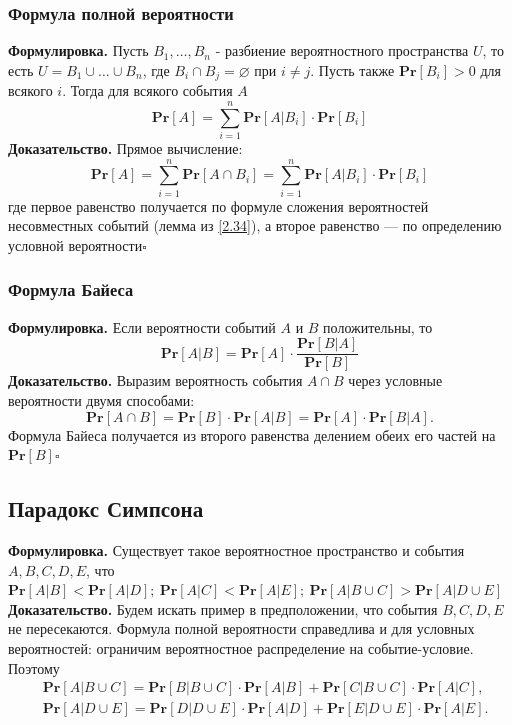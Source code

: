 \documentclass[a4paper]{article}
\newcommand{\qed}{\hfill$\square$}
\begin{document}
\subsubsection*{Формула полной вероятности}
\textbf{Формулировка.} Пусть $B_1, \ldots, B_n$ - разбиение вероятностного пространства $U$, то есть $U=B_1 \cup \ldots \cup B_n$, где $B_i \cap B_j=\varnothing$ при $i \neq j$. Пусть также $\textbf{Pr}\left[B_i\right]>0$ для всякого $i$. Тогда для всякого события $A$
$$\boxed{
\textbf{Pr}[A]=\sum_{i=1}^n \textbf{Pr}\left[A | B_i\right] \cdot \textbf{Pr}\left[B_i\right]}
$$
\indent\textbf{Доказательство.} Прямое вычисление:
$$
\textbf{Pr}[A]=\sum_{i=1}^n \textbf{Pr}\left[A \cap B_i\right]=\sum_{i=1}^n \textbf{Pr}\left[A | B_i\right] \cdot \textbf{Pr}\left[B_i\right]
$$
где первое равенство получается по формуле сложения вероятностей несовместных событий (лемма из \ref{2.34}), а второе равенство — по определению условной вероятности\qed

\subsubsection*{Формула Байеса}
\textbf{Формулировка.} Если вероятности событий $A$ и $B$ положительны, то $$\boxed{\textbf{Pr}[A|B]=\textbf{Pr}[A]\cdot\displaystyle\frac{\textbf{Pr}[B|A]}{\textbf{Pr}[B]}}$$
\indent\textbf{Доказательство.} Выразим вероятность события $A \cap B$ через условные вероятности двумя способами:
$$
\textbf{Pr}[A \cap B]=\textbf{Pr}[B] \cdot \textbf{Pr}[A | B]=\textbf{Pr}[A] \cdot \textbf{Pr}[B | A] .
$$
Формула Байеса получается из второго равенства делением обеих его частей на $\textbf{Pr}[B]$\qed

\subsection{Парадокс Симпсона}
\textbf{Формулировка.} Существует такое вероятностное пространство и события $A,B,C,D,E$, что $\textbf{Pr}[A|B]<\textbf{Pr}[A|D];\ \textbf{Pr}[A|C]<\textbf{Pr}[A|E];\ \textbf{Pr}[A|B\cup C]>\textbf{Pr}[A|D\cup E]$\\[2mm]
\indent\textbf{Доказательство.} Будем искать пример в предположении, что события $B, C, D, E$ не пересекаются. Формула полной вероятности справедлива и для условных вероятностей: ограничим вероятностное распределение на событие-условие. Поэтому
$$
\begin{aligned}
& \textbf{Pr}[A | B \cup C]=\textbf{Pr}[B | B \cup C] \cdot \textbf{Pr}[A | B]+\textbf{Pr}[C | B \cup C] \cdot \textbf{Pr}[A | C], \\
& \textbf{Pr}[A | D \cup E]=\textbf{Pr}[D | D \cup E] \cdot \textbf{Pr}[A | D]+\textbf{Pr}[E | D \cup E] \cdot \textbf{Pr}[A | E] .
\end{aligned}
$$
\end{document}
